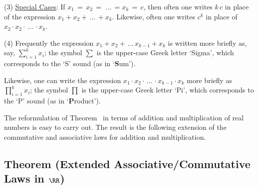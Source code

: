 \V

        (3) \underline{Special Cases}: If $x_{1} \,=\, x_{2} \,=\, \,{\ldots}\, = x_{k} \,=\, c$,
    then often one writes $k\,c$ in place of the expression $x_{1}+x_{2}+\,{\ldots}\,+x_{k}$. Likewise,
    often one writes $c^{k}$ in place of $x_{2}{\cdot}x_{2}{\cdot}\,{\ldots}\,{\cdot}x_{k}$.

\V

        (4) Frequently the expression $x_{1} + x_{2} + \,{\ldots}\, x_{k-1} + x_{k}$
    is written more briefly as, say, ${\displaystyle \sum_{i=1}^{k} x_{i}}$;
    the symbol ${\displaystyle \sum}$ is the upper-case Greek letter `Sigma', which corresponds to the `S' sound (as in `{\bf S}um').


        Likewise, one can write the expression $x_{1}{\cdot}x_{2}{\cdot}\,{\ldots}\,{\cdot}x_{k-1}{\cdot}x_{k}$
    more briefly as ${\displaystyle \prod_{i=1}^{k} x_{i}}$; the symbol 
    ${\displaystyle \prod}$ is the upper-case Greek letter `Pi', which corresponds to the `P' sound (as in `{\bf P}roduct').

\VV

        The reformulation of Theorem~ in terms of addition and multiplication of real numbers is easy to carry out.
    The result is the following extension of the commutative and associative laws for addition and multiplication.

\V

            \subsection{\small{\bf Theorem} (Extended Associative/Commutative Laws in ${\RR}$)}
            \label{ThmB10.32}

